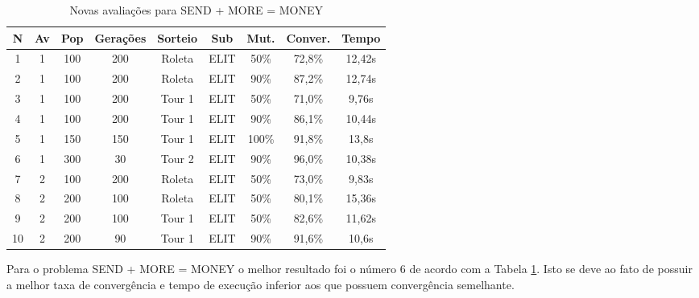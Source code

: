 \documentclass[a4paper, 12pt]{article}
\begin{document}
  \begin{table}[H]
    \centering
    \begin{tabular}{|c|c|c|c|c|c|c|c|c|}
      \hline
      N & Av & Pop & Gerações & Sorteio & Sub & Mut. & Conver. & Tempo  \\
      \hline
      1& 1 & 100 & 200 & Roleta & ELIT & 50\% &72,8\% & 12,42s \\
      \hline
      2& 1 & 100 & 200 & Roleta & ELIT & 90\% &87,2\% & 12,74s \\
      \hline
      3& 1 & 100 & 200 & Tour 1 & ELIT & 50\% &71,0\% & 9,76s \\
      \hline
      4& 1 & 100 & 200 & Tour 1 & ELIT & 90\% &86,1\% & 10,44s \\
      \hline
      5& 1 & 150 & 150 & Tour 1 & ELIT & 100\% &91,8\% & 13,8s \\
      \hline
      6& 1 & 300 & 30 & Tour 2 & ELIT & 90\% &96,0\% & 10,38s \\
      \hline
      7& 2 & 100 & 200 & Roleta & ELIT & 50\% &73,0\% & 9,83s \\
      \hline
      8& 2 & 200 & 100 & Roleta & ELIT & 50\% &80,1\% & 15,36s \\
      \hline
      9& 2 & 200 & 100 & Tour 1 & ELIT & 50\% &82,6\% & 11,62s \\
      \hline
      10& 2 & 200 & 90 & Tour 1 & ELIT & 90\% &91,6\% & 10,6s \\
      \hline
    \end{tabular}
    \caption{Novas avaliações para SEND + MORE = MONEY}
    \label{tab:send}
  \end{table}

  Para o problema SEND + MORE = MONEY o melhor resultado foi o número 6 de acordo
  com a Tabela \ref{tab:send}. Isto se deve ao fato de possuir a melhor taxa de
  convergência e tempo de execução inferior aos que possuem convergência semelhante.
\end{document}
